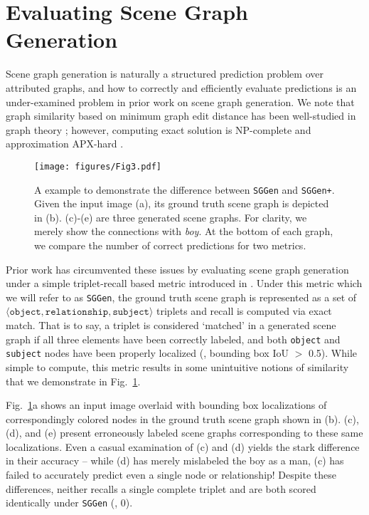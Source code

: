 \section{Evaluating Scene Graph Generation}

Scene graph generation is naturally a structured prediction problem over attributed graphs, and how to correctly and efficiently evaluate predictions is an under-examined problem in prior work on scene graph generation. We note that graph similarity based on minimum graph edit distance has been well-studied in graph theory \cite{gao2010survey}; however, computing exact solution is NP-complete and approximation APX-hard \cite{lin1994hardness}.

\begin{figure}[t]
  \begin{center}
    \texttt{[image: figures/Fig3.pdf]}
  \end{center}
 \vspace{-3mm}
\caption{A example to demonstrate the difference between \texttt{SGGen} and \texttt{SGGen+}. Given the input image (a), its ground truth scene graph is depicted in (b). (c)-(e) are three generated scene graphs. For clarity, we merely show the connections with \textit{boy}. At the bottom of each graph, we compare the number of correct predictions for two metrics.}
\label{fig:metric}
 \vspace{-1mm}
\end{figure}

Prior work has circumvented these issues by evaluating scene graph generation under a simple triplet-recall based metric introduced in \cite{xu2017scene}. Under this metric which we will refer to as \texttt{SGGen}, the ground truth scene graph is represented as a set of $\langle \mathtt{object, relationship, subject} \rangle$ triplets and recall is computed via exact match. That is to say, a triplet is considered `matched' in a generated scene graph if all three elements have been correctly labeled, and both \texttt{object} and \texttt{subject} nodes have been properly localized (\ie, bounding box IoU $>$ 0.5). While simple to compute, this metric results in some unintuitive notions of similarity that we demonstrate in Fig.~\ref{fig:metric}.

Fig.~\ref{fig:metric}a shows an input image overlaid with bounding box localizations of correspondingly colored nodes in the ground truth scene graph shown in (b). (c), (d), and (e) present erroneously labeled scene graphs corresponding to these same localizations. Even a casual examination of (c) and (d) yields the stark difference in their accuracy -- while (d) has merely mislabeled the boy as a man, (c) has failed to accurately predict even a single node or relationship! Despite these differences, neither recalls a single complete triplet and are both scored identically under \texttt{SGGen}  (\ie, 0).
%

